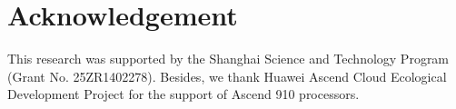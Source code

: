 \section*{Acknowledgement}

This research was supported by the Shanghai Science and Technology Program (Grant No. 25ZR1402278). Besides, we thank Huawei Ascend Cloud Ecological Development Project for the support of Ascend 910 processors.